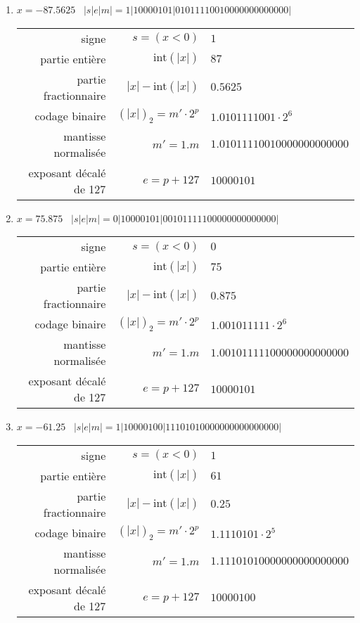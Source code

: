 \documentclass[11pt,a4paper]{article}
\begin{document}
\begin{enumerate}
\item $x = -87.5625$ \dotfill\ {$|s|e|m| = 1|10000101|01011110010000000000000|$}
{\footnotesize
\begin{tabular}{r@{ : }r@{ $=$ }l}
signe 					& $s = (x < 0)$ 			& $1$ \\
partie entière 			& $\mbox{int}(|x|)$ 		& $87$ \\
partie fractionnaire 	& $|x| - \mbox{int}(|x|)$ 	& $0.5625$ \\
codage binaire 			& $(|x|)_2 = m'\cdot 2^p$   & $1.0101111001 \cdot 2^{6}$ \\
mantisse normalisée 	& $m' = 1.m$ 				& $1.01011110010000000000000$ \\
exposant décalé de 127 	& $e = p+127$ 				& $10000101$ \\[2mm]
\end{tabular}
}

\item $x = 75.875$ \dotfill\ {$|s|e|m| = 0|10000101|00101111100000000000000|$}
{\footnotesize
\begin{tabular}{r@{ : }r@{ $=$ }l}
signe 					& $s = (x < 0)$ 			& $0$ \\
partie entière 			& $\mbox{int}(|x|)$ 		& $75$ \\
partie fractionnaire 	& $|x| - \mbox{int}(|x|)$ 	& $0.875$ \\
codage binaire 			& $(|x|)_2 = m'\cdot 2^p$   & $1.001011111 \cdot 2^{6}$ \\
mantisse normalisée 	& $m' = 1.m$ 				& $1.00101111100000000000000$ \\
exposant décalé de 127 	& $e = p+127$ 				& $10000101$ \\[2mm]
\end{tabular}
}

\item $x = -61.25$ \dotfill\ {$|s|e|m| = 1|10000100|11101010000000000000000|$}
{\footnotesize
\begin{tabular}{r@{ : }r@{ $=$ }l}
signe 					& $s = (x < 0)$ 			& $1$ \\
partie entière 			& $\mbox{int}(|x|)$ 		& $61$ \\
partie fractionnaire 	& $|x| - \mbox{int}(|x|)$ 	& $0.25$ \\
codage binaire 			& $(|x|)_2 = m'\cdot 2^p$   & $1.1110101 \cdot 2^{5}$ \\
mantisse normalisée 	& $m' = 1.m$ 				& $1.11101010000000000000000$ \\
exposant décalé de 127 	& $e = p+127$ 				& $10000100$ \\[2mm]
\end{tabular}
}


\end{enumerate}
\end{document}
